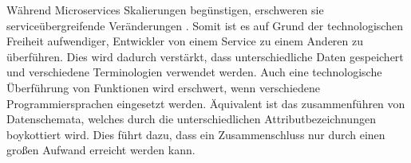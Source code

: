 Während Microservices Skalierungen begünstigen, erschweren sie serviceübergreifende Veränderungen \parencite[vgl.][Kap. 2.15]{newman_monolith_2019}. Somit ist es auf Grund der technologischen Freiheit aufwendiger, Entwickler von einem Service zu einem Anderen zu überführen. Dies wird dadurch verstärkt, dass unterschiedliche Daten gespeichert und verschiedene Terminologien verwendet werden. Auch eine technologische Überführung von Funktionen wird erschwert, wenn verschiedene Programmiersprachen eingesetzt werden. Äquivalent ist das zusammenführen von Datenschemata, welches durch die unterschiedlichen Attributbezeichnungen boykottiert wird. Dies führt dazu, dass ein Zusammenschluss nur durch einen großen Aufwand erreicht werden kann.

